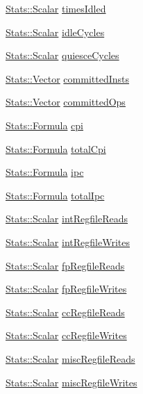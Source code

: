\begin{DoxyCompactItemize}
\item 
\hyperlink{classStats_1_1Scalar}{Stats::Scalar} \hyperlink{classFullO3CPU_a174dbfb3c7b892914a54cec44ed2eeaf}{timesIdled}
\item 
\hyperlink{classStats_1_1Scalar}{Stats::Scalar} \hyperlink{classFullO3CPU_a42e0f4c18fdb8ef7504f5c45d697fb14}{idleCycles}
\item 
\hyperlink{classStats_1_1Scalar}{Stats::Scalar} \hyperlink{classFullO3CPU_abb746a633705067014bd46e175928a51}{quiesceCycles}
\item 
\hyperlink{classStats_1_1Vector}{Stats::Vector} \hyperlink{classFullO3CPU_a45901e46dca5846ddd857aecbee16645}{committedInsts}
\item 
\hyperlink{classStats_1_1Vector}{Stats::Vector} \hyperlink{classFullO3CPU_a16789fd9e4f632e091d740c772094f80}{committedOps}
\item 
\hyperlink{classStats_1_1Formula}{Stats::Formula} \hyperlink{classFullO3CPU_af68d211cace2daa3df90471d7af93ad8}{cpi}
\item 
\hyperlink{classStats_1_1Formula}{Stats::Formula} \hyperlink{classFullO3CPU_a5bd2f06c271dd03138cad92251716f5d}{totalCpi}
\item 
\hyperlink{classStats_1_1Formula}{Stats::Formula} \hyperlink{classFullO3CPU_a6f168a31ee4084b6167d6761a4124014}{ipc}
\item 
\hyperlink{classStats_1_1Formula}{Stats::Formula} \hyperlink{classFullO3CPU_ae8551f10097f4b2e5ed3febf0d9417e3}{totalIpc}
\item 
\hyperlink{classStats_1_1Scalar}{Stats::Scalar} \hyperlink{classFullO3CPU_a46ee31ba135b8a26d7544abb48c242ef}{intRegfileReads}
\item 
\hyperlink{classStats_1_1Scalar}{Stats::Scalar} \hyperlink{classFullO3CPU_a0539045bb3599b1c57886d55a19fa2d2}{intRegfileWrites}
\item 
\hyperlink{classStats_1_1Scalar}{Stats::Scalar} \hyperlink{classFullO3CPU_a616c93341fb6b23449fcbbab249f2b41}{fpRegfileReads}
\item 
\hyperlink{classStats_1_1Scalar}{Stats::Scalar} \hyperlink{classFullO3CPU_ad308a484dfaaaff1d57080527f19f3be}{fpRegfileWrites}
\item 
\hyperlink{classStats_1_1Scalar}{Stats::Scalar} \hyperlink{classFullO3CPU_a54d1bb817fb61f8ea36ad3b2063f27c6}{ccRegfileReads}
\item 
\hyperlink{classStats_1_1Scalar}{Stats::Scalar} \hyperlink{classFullO3CPU_abd236585eb8f96cd37f7cea04204d456}{ccRegfileWrites}
\item 
\hyperlink{classStats_1_1Scalar}{Stats::Scalar} \hyperlink{classFullO3CPU_a587b32e057f5caad670d221c166bda5e}{miscRegfileReads}
\item 
\hyperlink{classStats_1_1Scalar}{Stats::Scalar} \hyperlink{classFullO3CPU_a457c81c9e364d41871df8cb5f04ea1b4}{miscRegfileWrites}
\end{DoxyCompactItemize}
